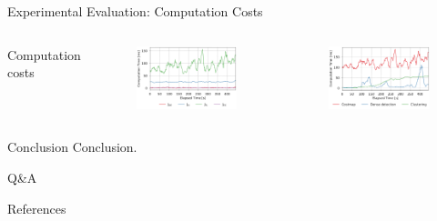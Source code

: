 \documentclass[10pt]{beamer}
\begin{document}
    \begin{frame}{Experimental Evaluation: Computation Costs}
        \begin{columns}[c,onlytextwidth]
                Computation costs

                \vspace{0.4cm}
                \begin{figure}
                    \centering
                    \includegraphics[width=\textwidth]{images/Fig8a.png}
                \end{figure}
                \vspace{-0.8cm}
                \begin{figure}
                    \centering
                    \includegraphics[width=\textwidth]{images/Fig8b.png}
                \end{figure}
        \end{columns}
    \end{frame}

    \begin{frame}{Conclusion}
        Conclusion.
    \end{frame}

    \begin{frame}[standout]
        Q\&A
    \end{frame}

    \appendix

    \begin{frame}{References}
        
        
    \end{frame}
\end{document}
